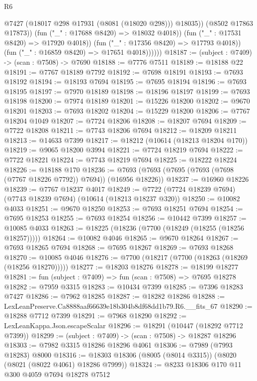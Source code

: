 \begin{lexlean}{R6}
\begin{coremodule}
                          @7427
                          (@18017 @298 @17931 (@8081 (@18020 @298)))
                          @18035))
                      (@8502 @17863 @17873))
                    (fun ("_" : @17688 @8420) => @18032 @4018))
                  (fun ("_" : @17531 @8420) => @17920 @4018))
                (fun ("_" : @17356 @8420) => @17793 @4018))
              (fun ("_" : @16859 @8420) => @17651 @4018))))))
@18187 := (subject : @7409) -> (scan : @7508) -> @7690
@18188 := @7776 @7511
@18189 := @18188 @22
@18191 := @7767 @18189 @7792
@18192 := @7698 @18191
@18193 := @7693 @18192
@18194 := @18193 @7694
@18195 := @7695 @18194
@18196 := @7693 @18195
@18197 := @7970 @18189
@18198 := @18196 @18197
@18199 := @7693 @18198
@18200 := @7974 @18189
@18201 := @15226 @18200
@18202 := @9670 @18201
@18203 := @7693 @18202
@18204 := @15229 @18200
@18206 := @7767 @18204 @1049
@18207 := @7724 @18206
@18208 := @18207 @7694
@18209 := @7722 @18208
@18211 := @7743 @18206 @7694
@18212 := @18209 @18211
@18213 := @14633 @7399
@18217 := @18212 (@10614 (@18213 @18204 @170))
@18219 := @9065 @18200 @3994
@18221 := @7724 @18219 @7694
@18222 := @7722 @18221
@18224 := @7743 @18219 @7694
@18225 := @18222 @18224
@18226 := @18188 @170
@18236 := @7693 (@7693 (@7695 (@7693 (@7698 (@7767 @18226 @7792)) @7694)) (@16956 @18226))
@18237 := @16960 @18226
@18239 := @7767 @18237 @4017
@18249 := @7722 (@7724 @18239 @7694) (@7743 @18239 @7694) (@10614 (@18213 @18237 @320))
@18250 := @10082 @4033
@18251 := @9670 @18250
@18253 := @7693 @18251 @7694
@18254 := @7695 @18253
@18255 := @7693 @18254
@18256 := @10442 @7399
@18257 := @10085 @4033
@18263 := @18225 (@18236 (@7700 (@18249 (@18255 (@18256 @18257)))))
@18264 := @10082 @4046
@18265 := @9670 @18264
@18267 := @7693 @18265 @7694
@18268 := @7695 @18267
@18269 := @7693 @18268
@18270 := @10085 @4046
@18276 := @7700 (@18217 (@7700 (@18263 (@18269 (@18256 @18270)))))
@18277 := @18203 @18276
@18278 := @18199 @18277
@18281 := fun (subject : @7409) => fun (scan : @7508) => @7695 @18278
@18282 := @7959 @3315
@18283 := @10434 @7399
@18285 := @7396 @18283 @7427
@18286 := @7962 @18285
@18287 := @18282 @18286
@18288 := LexLeanPreserve.Ca8888aaf66639e18b304b8df68dd1b79.R6.__fits_67
@18290 := @18288 @7712 @7399
@18291 := @7968 @18290
@18292 := LexLeanKappa.Json.escapeScalar
@18296 := @18291 (@10447 (@18292 @7712 @7399))
@18299 := (subject : @7409) -> (scan : @7508) -> @18287 @18296
@18303 := @7982 @3315 @18286 @18296 @4061
@18306 := @7989 (@7993 @18283) @8000
@18316 := @18303 @18306 (@8005 (@8014 @3315)) (@8020 (@8021 (@8022 @4061) @18286 @7999))
@18324 := @8233 @18306 @170 @11 @300 @4059 @7694 @18278 @7512

\end{coremodule}
\end{lexlean}
